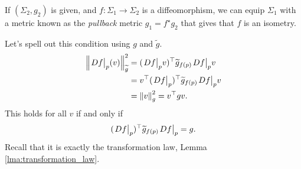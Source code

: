 \documentclass[a4paper]{article}
\begin{document}
\begin{example}
	If \( (\Sigma_2, g_2) \) is given, and \( f \colon \Sigma_1 \to \Sigma_2 \) is a diffeomorphism, we can equip \( \Sigma_1 \) with a metric known as the \textit{pullback} metric \( g_1 = f^\star g_2 \) that gives that \( f \) is an isometry.
\end{example}

Let's spell out this condition using $g$ and $ \widetilde{g} $. 
\begin{align*}
	\norm{\teval{D f}{p} (v)}_{\widetilde{g}}^2 &= (\teval{Df}{p}v)^\top \widetilde{g}_{f(p)} \teval{Df}{p}v \\ 
	&= v^\top(\teval{Df}{p})^\top\widetilde{g}_{f(p)}\teval{Df}{p}v\\ 
	&= \norm{v}_g^2 = v ^\top g v. 
\end{align*}
This holds for all $v$ if and only if 
\[
	(\teval{Df}{p})^\top\widetilde{g}_{f(p)}\teval{Df}{p} = g. 
\]
Recall that it is exactly the transformation law, Lemma \ref{lma:transformation_law}. 
\end{document}
